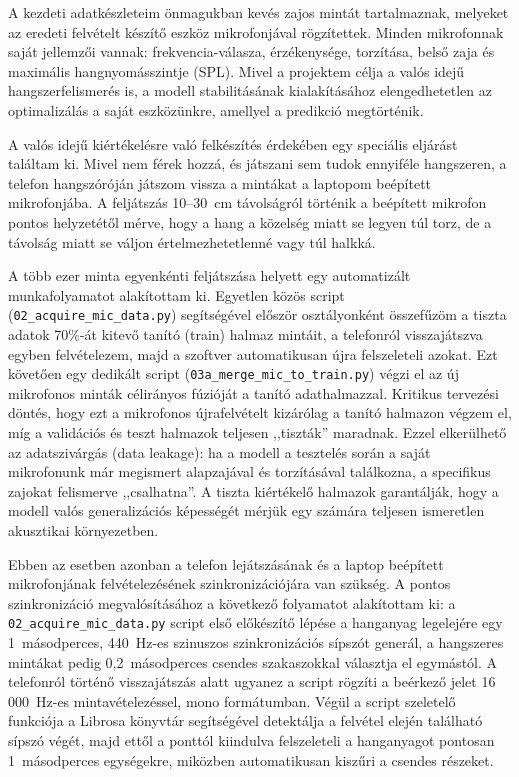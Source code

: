 A kezdeti adatkészleteim önmagukban kevés zajos mintát tartalmaznak, melyeket az eredeti felvételt készítő eszköz mikrofonjával rögzítettek. Minden mikrofonnak saját jellemzői vannak: frekvencia-válasza, érzékenysége, torzítása, belső zaja és maximális hangnyomásszintje (SPL). Mivel a projektem célja a valós idejű hangszerfelismerés is, a modell stabilitásának kialakításához elengedhetetlen az optimalizálás a saját eszközünkre, amellyel a predikció megtörténik.

A valós idejű kiértékelésre való felkészítés érdekében egy speciális eljárást találtam ki. Mivel nem férek hozzá, és játszani sem tudok ennyiféle hangszeren, a telefon hangszóróján játszom vissza a mintákat a laptopom beépített mikrofonjába. A feljátszás 10--30~cm távolságról történik a beépített mikrofon pontos helyzetétől mérve, hogy a hang a közelség miatt se legyen túl torz, de a távolság miatt se váljon értelmezhetetlenné vagy túl halkká.

A több ezer minta egyenkénti feljátszása helyett egy automatizált munkafolyamatot alakítottam ki. Egyetlen közös script (\texttt{02\_acquire\_\allowbreak mic\_\allowbreak data.py}) segítségével először osztályonként összefűzöm a tiszta adatok 70\%-át kitevő tanító (train) halmaz mintáit, a telefonról visszajátszva egyben felvételezem, majd a szoftver automatikusan újra felszeleteli azokat. Ezt követően egy dedikált script (\texttt{03a\_merge\_\allowbreak mic\_\allowbreak to\_\allowbreak train.py}) végzi el az új mikrofonos minták célirányos fúzióját a tanító adathalmazzal. Kritikus tervezési döntés, hogy ezt a mikrofonos újrafelvételt kizárólag a tanító halmazon végzem el, míg a validációs és teszt halmazok teljesen ,,tiszták'' maradnak. Ezzel elkerülhető az adatszivárgás (data leakage): ha a modell a tesztelés során a saját mikrofonunk már megismert alapzajával és torzításával találkozna, a specifikus zajokat felismerve ,,csalhatna''. A tiszta kiértékelő halmazok garantálják, hogy a modell valós generalizációs képességét mérjük egy számára teljesen ismeretlen akusztikai környezetben.

Ebben az esetben azonban a telefon lejátszásának és a laptop beépített mikrofonjának felvételezésének szinkronizációjára van szükség. A pontos szinkronizáció megvalósításához a következő folyamatot alakítottam ki: a \texttt{02\_acquire\_\allowbreak mic\_\allowbreak data.py} script első előkészítő lépése a hanganyag legelejére egy 1~másodperces, 440~Hz-es szinuszos szinkronizációs sípszót generál, a hangszeres mintákat pedig 0,2~másodperces csendes szakaszokkal választja el egymástól. A telefonról történő visszajátszás alatt ugyanez a script rögzíti a beérkező jelet 16\,000~Hz-es mintavételezéssel, mono formátumban. Végül a script szeletelő funkciója a Librosa könyvtár segítségével detektálja a felvétel elején található sípszó végét, majd ettől a ponttól kiindulva felszeleteli a hanganyagot pontosan 1~másodperces egységekre, miközben automatikusan kiszűri a csendes részeket.
 
